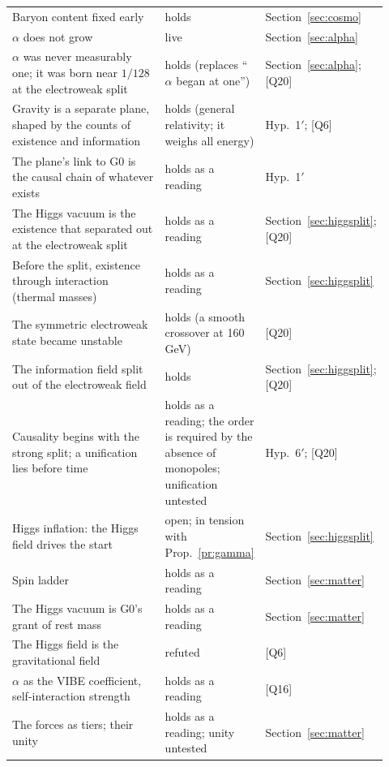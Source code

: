 \documentclass[11pt,a4paper]{article}
\theoremstyle{definition}
\theoremstyle{remark}
\newcommand{\chk}[1]{\textsf{[#1]}}
\newcommand{\nw}[1]{{\color{newc}#1}}
\newcommand{\vtag}{{\color{newc}\textsf{\scriptsize[v5.1]}}}
\theoremstyle{definition}
\begin{document}
\begin{center}
\begin{longtable}{@{}p{0.5\linewidth}p{0.24\linewidth}p{0.18\linewidth}@{}}
Baryon content fixed early & holds & Section~\ref{sec:cosmo} \\
$\alpha$ does not grow & live & Section~\ref{sec:alpha} \\
\nw{\vtag{} $\alpha$ was never measurably one; it was born near $1/128$ at the electroweak split} & \nw{holds (replaces ``$\alpha$ began at
one'')} & \nw{Section~\ref{sec:alpha}; \chk{Q20}} \\
\nw{\vtag{} Gravity is a separate plane, shaped by the counts of existence and information} & \nw{holds (general relativity; it weighs
all energy)} & \nw{Hyp.~1$'$; \chk{Q6}} \\
\nw{\vtag{} The plane's link to G0 is the causal chain of whatever exists} & \nw{holds as a reading} & \nw{Hyp.~1$'$} \\
\nw{\vtag{} The Higgs vacuum is the existence that separated out at the electroweak split} & \nw{holds as a reading} &
\nw{Section~\ref{sec:higgsplit}; \chk{Q20}} \\
\nw{\vtag{} Before the split, existence through interaction (thermal masses)} & \nw{holds as a reading} & \nw{Section~\ref{sec:higgsplit}} \\
\nw{\vtag{} The symmetric electroweak state became unstable} & \nw{holds (a smooth crossover at 160\,GeV)} & \nw{\chk{Q20}} \\
\nw{\vtag{} The information field split out of the electroweak field} & \nw{holds} & \nw{Section~\ref{sec:higgsplit}; \chk{Q20}} \\
\nw{\vtag{} Causality begins with the strong split; a unification lies before time} & \nw{holds as a reading; the order is required by
the absence of monopoles; unification untested} & \nw{Hyp.~6$'$; \chk{Q20}} \\
\nw{\vtag{} Higgs inflation: the Higgs field drives the start} & \nw{open; in tension with Prop.~\ref{pr:gamma}} &
\nw{Section~\ref{sec:higgsplit}} \\
Spin ladder & holds as a reading & Section~\ref{sec:matter} \\
The Higgs vacuum is G0's grant of rest mass & holds as a reading & Section~\ref{sec:matter} \\
The Higgs field is the gravitational field & refuted & \chk{Q6} \\
$\alpha$ as the VIBE coefficient, self-interaction strength & holds as a reading & \chk{Q16} \\
The forces as tiers; their unity & holds as a reading; unity untested & Section~\ref{sec:matter} \\
\bottomrule
\end{longtable}
\end{center}
\end{document}
